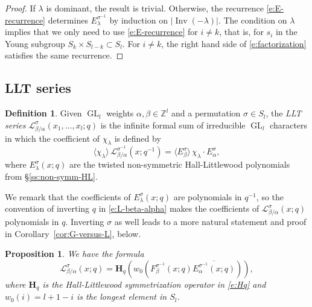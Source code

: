 \documentclass[12pt]{amsart}
\newtheorem{prop}[thm]{Proposition}
\theoremstyle{definition}
\newtheorem{defn}[thm]{Definition}
\theoremstyle{remark}
\newcommand{\ZZ}{{\mathbb Z}}
\newcommand{\Hbold}{{\mathbf H}}
\newcommand{\Lcal}{{\mathcal L}}
\DeclareMathOperator{\Inv}{Inv}
\DeclareMathOperator{\GL}{GL}
\begin{document}
\begin{proof}
If $\lambda $ is dominant, the result is trivial.  Otherwise, the
recurrence \eqref{e:E-recurrence} determines $E^{\sigma
^{-1}}_{\lambda }$ by induction on $|\Inv (-\lambda )|$.  The
condition on $\lambda $ implies that we only need to use
\eqref{e:E-recurrence} for $i\not =k$, that is, for $s_{i}$ in the
Young subgroup $S_{k}\times S_{l-k}\subset S_{l}$.  For $i\not =k$,
the right hand side of \eqref{e:factorization} satisfies the same
recurrence.
\end{proof}


\subsection{LLT series}
\label{ss:L-beta-alpha}

\begin{defn}\label{def:L-beta-alpha}
Given $\GL _{l}$ weights $\alpha ,\beta \in \ZZ ^{l}$ and a
permutation $\sigma \in S_{l}$, the {\em LLT series} $\Lcal^{\sigma }
_{\beta /\alpha }(x_{1},\ldots,x_{l};q)$ is the infinite formal sum of
irreducible $\GL _{l}$ characters in which the coefficient of $\chi
_{\lambda }$ is defined by
\begin{equation}\label{e:L-beta-alpha}
\langle \chi _{\lambda } \rangle\, \Lcal ^{\sigma ^{-1}}_{\beta /\alpha
}(x;q^{-1}) = \langle E^{\sigma }_{\beta } \rangle \, \chi
_{\lambda } \cdot E^{\sigma }_{\alpha },
\end{equation}
where $E^{\sigma }_{\lambda }(x;q)$ are the twisted non-symmetric
Hall-Littlewood polynomials from \S \ref{ss:non-symm-HL}.
\end{defn}

We remark that the coefficients of $E^{\sigma }_{\lambda }(x;q)$ are
polynomials in $q^{-1}$, so the convention of inverting $q$ in
\eqref{e:L-beta-alpha} makes the coefficients of $\Lcal ^{\sigma
}_{\beta /\alpha }(x;q)$ polynomials in $q$.  Inverting $\sigma $ as
well leads to a more natural statement and proof in
Corollary~\ref{cor:G-versus-L}, below.


\begin{prop}\label{prop:L-formula}
We have the formula
\begin{equation}\label{e:L-formula}
\Lcal ^{\sigma }_{\beta /\alpha }(x;q) = \Hbold _{q}(w_{0}(F^{\sigma
^{-1} }_{\beta }(x;q) \overline{E^{\sigma ^{-1}}_{\alpha }(x;q)})),
\end{equation}
where $\Hbold _{q}$ is the Hall-Littlewood symmetrization operator in
\eqref{e:Hq} and $w_{0}(i)=l+1-i$ is the longest element in $S_{l}$.
\end{prop}
\end{document}
